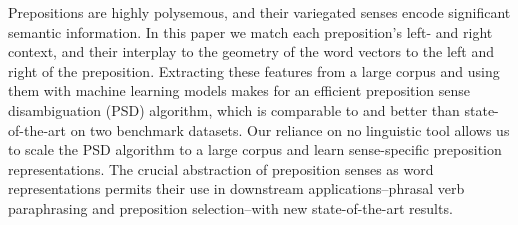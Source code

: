 Prepositions are highly polysemous, and their variegated senses encode significant semantic information. In this paper we match each preposition's left- and right context,  and their interplay to the geometry of the word vectors to the left and right of the preposition. Extracting these features from a large corpus and using them with machine learning models makes for an efficient preposition sense disambiguation (PSD) algorithm, which is comparable to and better than state-of-the-art on two benchmark datasets. Our reliance on no  linguistic tool allows us to scale the PSD  algorithm  to a large corpus and learn sense-specific preposition representations. The crucial abstraction of preposition senses as word representations permits their use in downstream applications--phrasal verb paraphrasing and preposition selection--with new state-of-the-art results.
